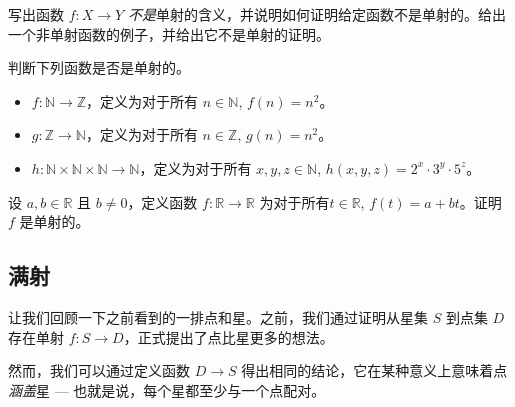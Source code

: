 \begin{exercise}
写出函数 $f : X \to Y$ \textit{不是}单射的含义，并说明如何证明给定函数不是单射的。给出一个非单射函数的例子，并给出它不是单射的证明。
\end{exercise}

\begin{exercise}
判断下列函数是否是单射的。
\begin{itemize} 
\item $f : \mathbb{N} \to \mathbb{Z}$，定义为对于所有 $n \in \mathbb{N}$, $f(n)=n^2$。
\item $g : \mathbb{Z} \to \mathbb{N}$，定义为对于所有 $n \in \mathbb{Z}$, $g(n)=n^2$。
\item $h : \mathbb{N} \times \mathbb{N} \times \mathbb{N} \to \mathbb{N}$，定义为对于所有 $x,y,z \in \mathbb{N}$, $h(x,y,z) = 2^x \cdot 3^y \cdot 5^z$。
\end{itemize}
\end{exercise}

\begin{exercise}
\label{exLinearPolynomialIsInjective}
设 $a,b \in \mathbb{R}$ 且 $b \ne 0$，定义函数 $f : \mathbb{R} \to \mathbb{R}$ 为对于所有$t \in \mathbb{R}$, $f(t) = a+bt$。证明 $f$ 是单射的。
\end{exercise}

\subsection*{满射}

让我们回顾一下之前看到的一排点和星。之前，我们通过证明从星集 $S$ 到点集 $D$ 存在单射 $f : S \to D$，正式提出了点比星更多的想法。

然而，我们可以通过定义函数 $D \to S$ 得出相同的结论，它在某种意义上意味着点\textit{涵盖}星 --- 也就是说，每个星都至少与一个点配对。

\begin{center}
\end{center}


